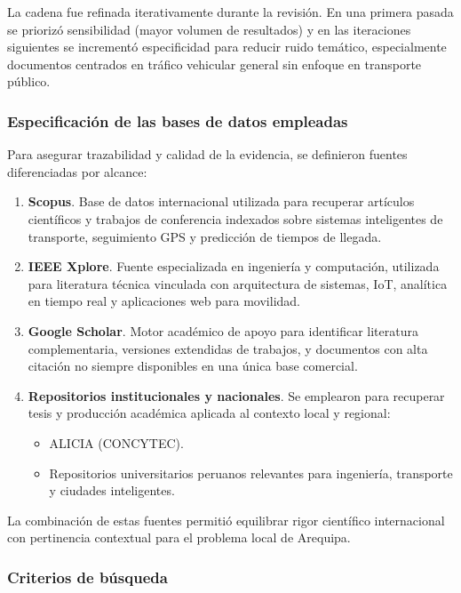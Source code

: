 La cadena fue refinada iterativamente durante la revisión. En una primera pasada se priorizó sensibilidad (mayor volumen de resultados) y en las iteraciones siguientes se incrementó especificidad para reducir ruido temático, especialmente documentos centrados en tráfico vehicular general sin enfoque en transporte público.

\subsubsection{Especificación de las bases de datos empleadas}

Para asegurar trazabilidad y calidad de la evidencia, se definieron fuentes diferenciadas por alcance:

\begin{enumerate}
    \item \textbf{Scopus}. Base de datos internacional utilizada para recuperar artículos científicos y trabajos de conferencia indexados sobre sistemas inteligentes de transporte, seguimiento GPS y predicción de tiempos de llegada.

    \item \textbf{IEEE Xplore}. Fuente especializada en ingeniería y computación, utilizada para literatura técnica vinculada con arquitectura de sistemas, IoT, analítica en tiempo real y aplicaciones web para movilidad.

    \item \textbf{Google Scholar}. Motor académico de apoyo para identificar literatura complementaria, versiones extendidas de trabajos, y documentos con alta citación no siempre disponibles en una única base comercial.

    \item \textbf{Repositorios institucionales y nacionales}. Se emplearon para recuperar tesis y producción académica aplicada al contexto local y regional:
    \begin{itemize}
        \item ALICIA (CONCYTEC).
        \item Repositorios universitarios peruanos relevantes para ingeniería, transporte y ciudades inteligentes.
    \end{itemize}
\end{enumerate}

La combinación de estas fuentes permitió equilibrar rigor científico internacional con pertinencia contextual para el problema local de Arequipa.

\subsubsection{Criterios de búsqueda}

